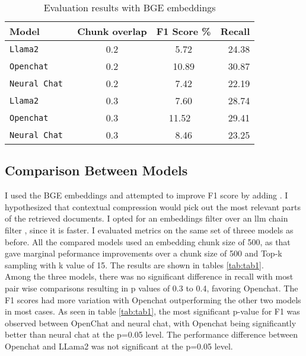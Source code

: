 \documentclass[11pt]{article}
\begin{document}
  \begin{table}
    \centering
      \begin{tabular}{ l c c r }
      \hline
        \textbf{Model} & \textbf{Chunk overlap} & \textbf{F1 Score \%} & \textbf{Recall}\\
        \hline
        \verb|Llama2 | & 0.2 &  {5.72} & {24.38} \\
        \verb|Openchat | & 0.2 & {10.89}  & {30.87}\\ 
        \verb|Neural Chat | & 0.2 & {7.42}  & {22.19}\\ 
        \verb|Llama2 | & 0.3 &  {7.60}  & {28.74}\\
        \verb|Openchat | & 0.3 & {11.52} \ & {29.41} \\ 
        \verb|Neural Chat | & 0.3 & {8.46}  & {23.25}\\ 
        \hline
      \end{tabular}
  \caption{Evaluation results with BGE embeddings}
  \label{tab:accents2}
  \end{table}

\subsection{Comparison Between Models}

I used the BGE embeddings and attempted to improve F1 score by adding \cite{contextual-compression}. I hypothesized that contextual compression \cite{contextual-compression} would 
pick out the most relevant parts of the retrieved documents. I opted for an embeddings filter \cite{embeddings_filter} over an llm chain filter \cite{llm_chain_filter}, since it is faster. 
I evaluated metrics on the same set of threee models as before. 
All the compared models used an embedding chunk size of 500, as that gave marginal peformance improvements over a chunk size of 500 and Top-k sampling with k value of 15. 
The results are shown in tables \ref{tab:tab1}.
\\
Among the three models, there was no significant difference in recall with most pair wise comparisons resulting in p values of 0.3 to 0.4, favoring Openchat.
The F1 scores had more variation with Openchat outperforming the other two models in most cases.
As seen in table \ref{tab:tab1}, the most significant p-value for F1 was observed between OpenChat and neural chat, with Openchat being significantly better than neural chat at the p=0.05 level.
The performance difference between Openchat and LLama2 was not significant at the p=0.05 level.
\end{document}
